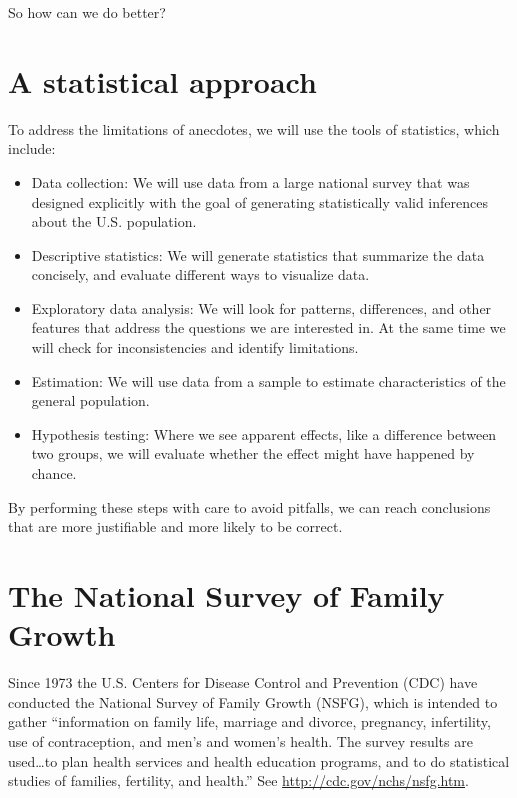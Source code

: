 \documentclass[12pt]{book}
\begin{document}
So how can we do better?


\section{A statistical approach}

To address the limitations of anecdotes, we will use the tools
of statistics, which include:

\begin{itemize}

\item Data collection: We will use data from a large national survey
  that was designed explicitly with the goal of generating
  statistically valid inferences about the U.S. population.

\item Descriptive statistics: We will generate statistics that
  summarize the data concisely, and evaluate different ways to
  visualize data.

\item Exploratory data analysis: We will look for
  patterns, differences, and other features that address the questions
  we are interested in.  At the same time we will check for
  inconsistencies and identify limitations.

\item Estimation: We will use data from a sample to estimate
  characteristics of the general population.

\item Hypothesis testing: Where we see apparent effects, like a
  difference between two groups, we will evaluate whether the effect
  might have happened by chance.

\end{itemize}

By performing these steps with care to avoid pitfalls, we can
reach conclusions that are more justifiable and more likely to be
correct.


\section{The National Survey of Family Growth}
\label{nsfg}

Since 1973 the U.S. Centers for Disease Control and Prevention (CDC)
have conducted the National Survey of Family Growth (NSFG),
which is intended to gather ``information on family life, marriage and
divorce, pregnancy, infertility, use of contraception, and men's and
women's health. The survey results are used\ldots to plan health services and
health education programs, and to do statistical studies of families,
fertility, and health.''  See
  \url{http://cdc.gov/nchs/nsfg.htm}.
\end{document}

